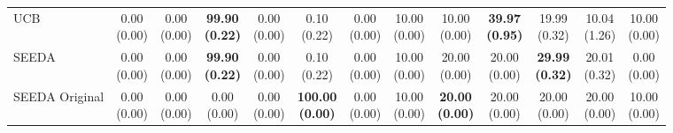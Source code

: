 \begin{table}[H]
{\begin{tabular}{l|cccccc|cccccc}
UCB & \makecell{0.00 \\ (0.00)} & \makecell{0.00 \\ (0.00)} & {\cellcolor[HTML]{C8E6C9}} \bfseries \makecell{99.90 \\ (0.22)} & \makecell{0.00 \\ (0.00)} & \makecell{0.10 \\ (0.22)} & \makecell{0.00 \\ (0.00)} & \makecell{10.00 \\ (0.00)} & \makecell{10.00 \\ (0.00)} & {\cellcolor[HTML]{C8E6C9}} \bfseries \makecell{39.97 \\ (0.95)} & \makecell{19.99 \\ (0.32)} & \makecell{10.04 \\ (1.26)} & \makecell{10.00 \\ (0.00)} \\
SEEDA & \makecell{0.00 \\ (0.00)} & \makecell{0.00 \\ (0.00)} & {\cellcolor[HTML]{C8E6C9}} \bfseries \makecell{99.90 \\ (0.22)} & \makecell{0.00 \\ (0.00)} & \makecell{0.10 \\ (0.22)} & \makecell{0.00 \\ (0.00)} & \makecell{10.00 \\ (0.00)} & \makecell{20.00 \\ (0.00)} & {\cellcolor[HTML]{C8E6C9}} \makecell{20.00 \\ (0.00)} & \bfseries \makecell{29.99 \\ (0.32)} & \makecell{20.01 \\ (0.32)} & \makecell{0.00 \\ (0.00)} \\
SEEDA Original & \makecell{0.00 \\ (0.00)} & \makecell{0.00 \\ (0.00)} & {\cellcolor[HTML]{C8E6C9}} \makecell{0.00 \\ (0.00)} & \makecell{0.00 \\ (0.00)} & \bfseries \makecell{100.00 \\ (0.00)} & \makecell{0.00 \\ (0.00)} & \makecell{10.00 \\ (0.00)} & \bfseries \makecell{20.00 \\ (0.00)} & {\cellcolor[HTML]{C8E6C9}} \makecell{20.00 \\ (0.00)} & \makecell{20.00 \\ (0.00)} & \makecell{20.00 \\ (0.00)} & \makecell{10.00 \\ (0.00)} \\

\end{tabular}}
\end{table}
